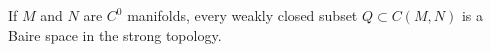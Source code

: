 If $M$ and $N$ are $C^0$ manifolds, every weakly closed subset $Q \subset C(M,N)$ is a Baire space in the strong topology.
